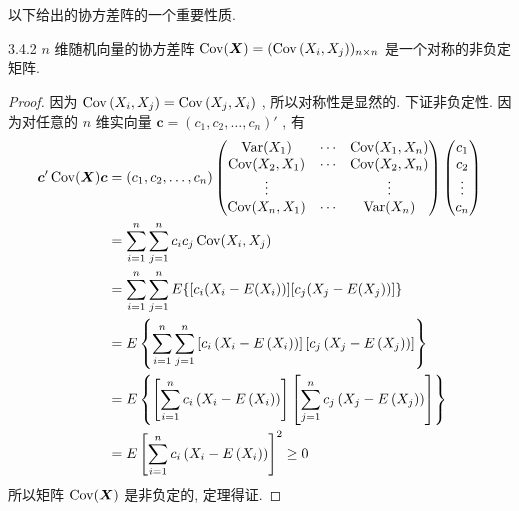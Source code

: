 	以下给出的协方差阵的一个重要性质.
	\begin{theorem}{}{3.4.2}
		$n$ 维随机向量的协方差阵 $\operatorname{Cov}(\boldsymbol{X})=( \operatorname{Cov}\left(X_i,X_j\right) )_{n\times n}$ 是一个对称的非负定矩阵.
		\begin{proof}
			因为 $\operatorname{Cov}\left(X_i,X_j\right)=\operatorname{Cov}\left(X_j,X_i\right)$ , 所以对称性是显然的. 下证非负定性. 因为对任意的 $n$ 维实向量 $\boldsymbol{c}=(c_1,c_2,\ldots,c_n)'$ , 有
			\begin{align*}
				\boldsymbol{c}'\operatorname{Cov}(\boldsymbol{X})\boldsymbol{c} &= (c_1,c_2,\ldots,c_n)\begin{pmatrix}
					\operatorname{Var}(X_1) & \cdots & \operatorname{Cov}(X_1,X_n)\\
					\operatorname{Cov}(X_2,X_1) & \cdots & \operatorname{Cov}(X_2,X_n)\\
					\vdots & & \vdots\\
					\operatorname{Cov}(X_n,X_1) & \cdots & \operatorname{Var}(X_n)
				\end{pmatrix}
				\begin{pmatrix}
					c_1\\
					c_2\\
					\vdots\\
					c_n
				\end{pmatrix}\\
				&= \sum_{i=1}^{n}\sum_{j=1}^{n}c_{i}c_{j}\operatorname{Cov}(X_i,X_j)\\
				&= \sum_{i=1}^{n}\sum_{j=1}^{n}E\{ [c_{i} (X_{i}-E(X_{i}))] [c_{j}(X_{j}-E(X_{j}))] \}\\
				&= E\left\{\sum_{i=1}^{n} \sum_{j=1}^{n}\left[c_{i}\left(X_{i}-E\left(X_{i}\right)\right)\right]\left[c_{j}\left(X_{j}-E\left(X_{j}\right)\right)\right]\right\}\\
				&= E\left\{\left[\sum_{i=1}^{n} c_{i}\left(X_{i}-E\left(X_{i}\right)\right)\right]\left[\sum_{j=1}^{n} c_{j}\left(X_{j}-E\left(X_{j}\right)\right)\right]\right\}\\
				&= E\left[\sum_{i=1}^{n} c_{i}\left(X_{i}-E\left(X_{i}\right)\right)\right]^{2} \ge 0
			\end{align*}
			所以矩阵 $\operatorname{Cov}(\boldsymbol{X})$ 是非负定的, 定理得证.
		\end{proof}
	\end{theorem}

